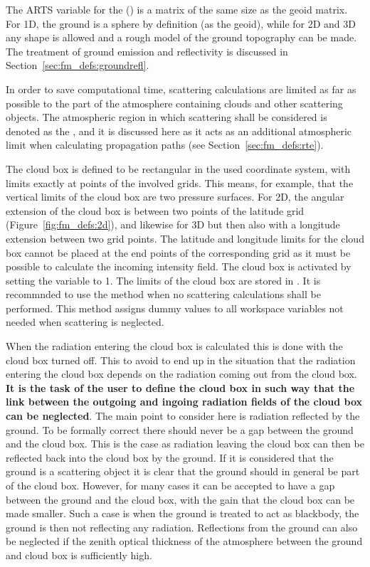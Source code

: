 The ARTS variable for the 
() is a matrix of the same size as the geoid
matrix. For 1D, the ground is a sphere by definition (as the geoid),
while for 2D and 3D any shape is allowed and a rough model of the
ground topography can be made. The treatment of ground emission
and reflectivity is discussed in Section~\ref{sec:fm_defs:groundrefl}.


\label{sec:fm_defs:cloudbox}

In order to save computational time, scattering calculations are
limited as far as possible to the part of the atmosphere containing
clouds and other scattering objects. The atmospheric region in which
scattering shall be considered is denoted as the ,
and it is discussed here as it acts as an additional atmospheric limit
when calculating propagation paths (see
Section~\ref{sec:fm_defs:rte}).

The cloud box is defined to be rectangular in the used coordinate
system, with limits exactly at points of the involved grids. This
means, for example, that the vertical limits of the cloud box are two
pressure surfaces. For 2D, the angular extension of the cloud box is
between two points of the latitude grid (Figure~\ref{fig:fm_defs:2d}),
and likewise for 3D but then also with a longitude extension between
two grid points.  The latitude and longitude limits for the cloud box
cannot be placed at the end points of the corresponding grid as it
must be possible to calculate the incoming intensity field. The cloud
box is activated by setting the variable  to 1.
The limits of the cloud box are stored in .
It is recommnded to use the method  when no
scattering calculations shall be performed. This method assigns dummy
values to all workspace variables not needed when scattering is
neglected.

When the radiation entering the cloud box is calculated this is done
with the cloud box turned off. This to avoid to end up in the
situation that the radiation entering the cloud box depends on the
radiation coming out from the cloud box. {\bf It is the task of the
  user to define the cloud box in such way that the link between the
  outgoing and ingoing radiation fields of the cloud box can be
  neglected}. The main point to consider here is radiation reflected
by the ground. To be formally correct there should never be a gap
between the ground and the cloud box. This is the case as radiation
leaving the cloud box can then be reflected back into the cloud box by
the ground. If it is considered that the ground is a scattering object
it is clear that the ground should in general be part of the cloud
box. However, for many cases it can be accepted to have a gap between
the ground and the cloud box, with the gain that the cloud box can be
made smaller. Such a case is when the ground is treated to act as
blackbody, the ground is then not reflecting any radiation.
Reflections from the ground can also be neglected if the zenith
optical thickness of the atmosphere between the ground and cloud box
is sufficiently high.



